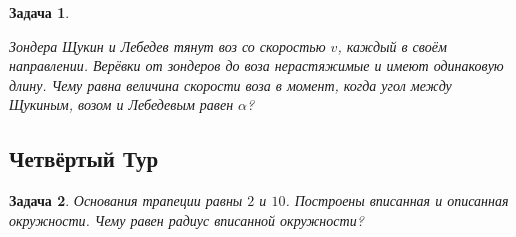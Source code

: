 \documentclass[a4paper, 11pt]{article}
\theoremstyle{break}
\newtheorem{problem}{Задача}[subsection]
\begin{document}
\begin{problem}
\begin{multicols}{2}
Зондера Щукин и Лебедев тянут воз со скоростью $v$,
каждый в своём направлении. Верёвки от зондеров до воза нерастяжимые и имеют одинаковую длину.
Чему равна величина скорости воза в момент, когда угол между Щукиным,
возом и Лебедевым равен $\alpha$?

\begin{minipage}{0.4\textwidth}
\begin{center}
\end{center}
\end{minipage}
\end{multicols}

\end{problem}

\subsection*{Четвёртый Тур}
\setcounter{problem}{0}

\begin{problem}
Основания трапеции равны $2$ и $10$. Построены вписанная и описанная окружности.
Чему равен радиус вписанной окружности?
\end{problem}
\end{document}

